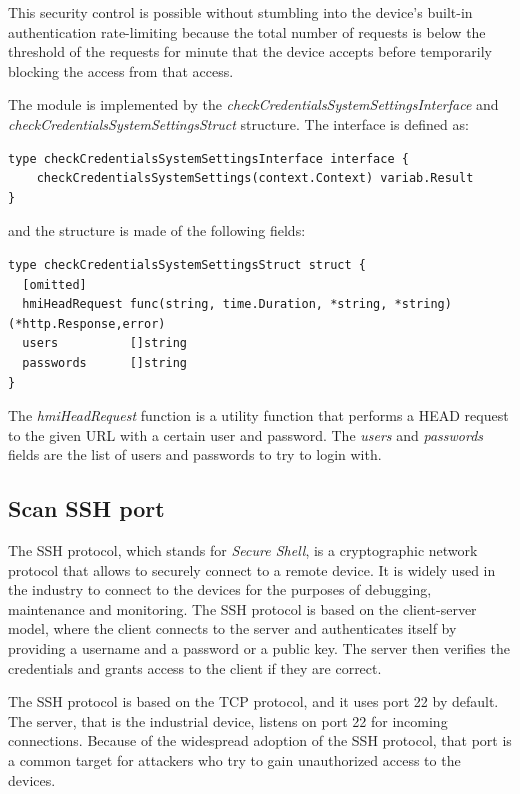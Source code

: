 This security control is possible without stumbling into the device's built-in authentication rate-limiting because the total number of requests is below the threshold of the requests for minute that the device accepts before temporarily blocking the access from that access.

The module is implemented by the \textit{checkCredentialsSystemSettingsInterface} and \textit{checkCredentialsSystemSettingsStruct} structure. The interface is defined as:

\begin{lstlisting}[style=golang]
type checkCredentialsSystemSettingsInterface interface {
	checkCredentialsSystemSettings(context.Context) variab.Result
}
\end{lstlisting}

and the structure is made of the following fields:

\begin{lstlisting}[style=golang]
type checkCredentialsSystemSettingsStruct struct {
  [omitted]
  hmiHeadRequest func(string, time.Duration, *string, *string) (*http.Response,error)
  users          []string
  passwords      []string
}
\end{lstlisting}

The \textit{hmiHeadRequest} function is a utility function that performs a HEAD request to the given URL with a certain user and password. The \textit{users} and \textit{passwords} fields are the list of users and passwords to try to login with.

\subsection{Scan SSH port}

The SSH protocol, which stands for \textit{Secure Shell}, is a cryptographic network protocol that allows to securely connect to a remote device. It is widely used in the industry to connect to the devices for the purposes of debugging, maintenance and monitoring. The SSH protocol is based on the client-server model, where the client connects to the server and authenticates itself by providing a username and a password or a public key. The server then verifies the credentials and grants access to the client if they are correct.

The SSH protocol is based on the TCP protocol, and it uses port 22 by default. The server, that is the industrial device, listens on port 22 for incoming connections. Because of the widespread adoption of the SSH protocol, that port is a common target for attackers who try to gain unauthorized access to the devices.

